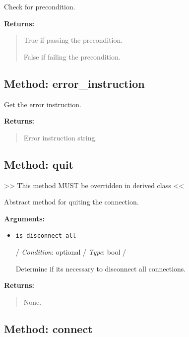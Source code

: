 Check for precondition.

\textbf{Returns:}

\begin{quote}
True if passing the precondition.

False if failing the precondition.
\end{quote}

\hypertarget{qconnectbase-connection-base-method-error_instruction-6}{%
\subsection{Method: error\_instruction}\label{qconnectbase-connection-base-method-error_instruction-6}}

Get the error instruction.

\textbf{Returns:}

\begin{quote}
Error instruction string.
\end{quote}

\hypertarget{qconnectbase-connection-base-method-quit-7}{%
\subsection{Method: quit}\label{qconnectbase-connection-base-method-quit-7}}

\textgreater\textgreater{} This method MUST be overridden in derived
class \textless\textless{}

Abstract method for quiting the connection.

\textbf{Arguments:}

\begin{itemize}
\item
  \texttt{is\_disconnect\_all}

  / \emph{Condition}: optional / \emph{Type}: bool /

  Determine if it\textquotesingle s necessary to disconnect all
  connections.
\end{itemize}

\textbf{Returns:}

\begin{quote}
None.
\end{quote}

\hypertarget{qconnectbase-connection-base-method-connect-8}{%
\subsection{Method: connect}\label{qconnectbase-connection-base-method-connect-8}}

